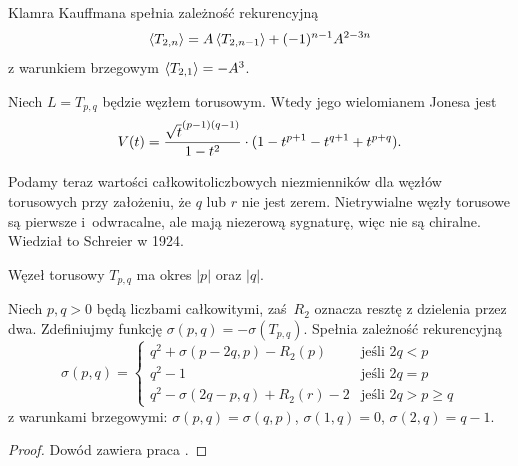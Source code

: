 \begin{proposition}
%
    Klamra Kauffmana spełnia zależność rekurencyjną
    \begin{equation}
        \left\langle{T_{2, n}}\right\rangle = A \left\langle{T_{2,n-1}}\right\rangle + (-1)^{n-1} A^{2-3n}
    \end{equation}
    z warunkiem brzegowym $\left\langle{T_{2,1}}\right\rangle = -A^3$.
\end{proposition}

\begin{proposition}
%
    Niech $L = T_{p, q}$ będzie węzłem torusowym.
    Wtedy jego wielomianem Jonesa jest
    \begin{equation}
        V(t) = \frac {{\sqrt t}^{(p-1)(q-1)}}{1-t^2} \cdot (1 - t^{p+1} - t^{q+1} + t^{p+q}).
    \end{equation}
\end{proposition}

Podamy teraz wartości całkowitoliczbowych niezmienników dla węzłów torusowych przy założeniu, że $q$ lub $r$ nie jest zerem.
Nietrywialne węzły torusowe są pierwsze i~odwracalne, ale mają niezerową sygnaturę, więc nie są chiralne.
Wiedział to Schreier w 1924.

\begin{proposition}
%
    Węzeł torusowy $T_{p, q}$ ma okres $|p|$ oraz $|q|$.
\end{proposition}

\begin{proposition}
%
    Niech $p, q > 0$ będą liczbami całkowitymi, zaś $R_2$ oznacza resztę z dzielenia przez dwa.
    Zdefiniujmy funkcję $\sigma(p, q) = - \sigma(T_{p, q})$.
    Spełnia zależność rekurencyjną
    \begin{equation}
        \sigma(p, q) = \begin{cases}
             q^2 + \sigma(p-2q, p) - R_2(p)       & \text{jeśli } 2q < p \\
             q^2 - 1                              & \text{jeśli } 2q = p \\
             q^2 - \sigma(2q - p, q) + R_2(r) - 2 & \text{jeśli } 2q > p \ge q
        \end{cases}
    \end{equation}
    z warunkami brzegowymi: $\sigma(p, q) = \sigma(q, p)$, $\sigma(1, q) = 0$, $\sigma(2, q) = q-1$.
\end{proposition}

\begin{proof}
    Dowód zawiera praca \cite{litherland81}.
\end{proof}

